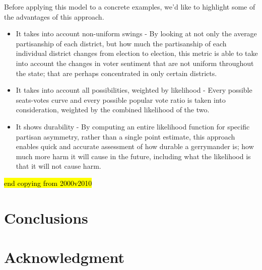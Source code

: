 \documentclass[preprint,12pt]{article}
\newcommand{\KB}[2][cyan]{ {\sethlcolor{#1} \hl{#2}} }
\begin{document}
Before applying this model to a concrete examples, we'd like to highlight some of the advantages of this approach.

\begin{itemize}

\item It takes into account non-uniform swings - By looking at not only the average partisanship of each district, but how much the partisanship of each individual district changes from election to election, this metric is able to take into account the changes in voter sentiment that are not uniform throughout the state; that are perhaps concentrated in only certain districts.

\item It takes into account all possibilities, weighted by likelihood - Every possible seats-votes curve and every possible popular vote ratio is taken into consideration, weighted by the combined likelihood of the two.

\item It shows durability - By computing an entire likelihood function for specific partisan asymmetry, rather than a single point estimate, this approach enables quick and accurate assessment of how durable a gerrymander is; how much more harm it will cause in the future, including what the likelihood is that it will not cause harm.

\end{itemize}

\KB{end copying from 2000v2010}

\section{Conclusions}

\clearpage
\section*{Acknowledgment}
\section*{}
%


\clearpage
\end{document}
